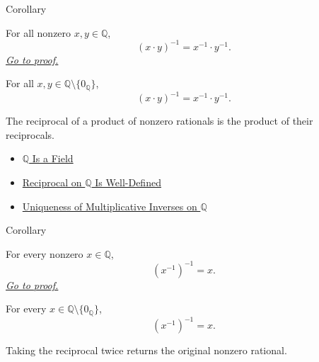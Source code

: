 \begin{corollarybox}{Corollary}
\begin{corollary}
\label{cor:inverse-of-product-on-q}
For all nonzero $x,y\in\mathbb{Q}$,
\[
(x\cdot y)^{-1}=x^{-1}\cdot y^{-1}.
\]
\hyperref[prf:inverse-of-product-on-q]{\textit{Go to proof.}}
\end{corollary}
\end{corollarybox}

\begin{remark*}
For all $x,y\in\mathbb{Q}\setminus\{0_{\mathbb{Q}}\}$,
\[
(x\cdot y)^{-1}=x^{-1}\cdot y^{-1}.
\]
\end{remark*}

\begin{remark*}[Interpretation]
The reciprocal of a product of nonzero rationals is the product of their
reciprocals.
\end{remark*}

\begin{dependencies}
\begin{itemize}
  \item \hyperref[thm:q-is-a-field]{$\mathbb{Q}$ Is a Field}
  \item \hyperref[thm:reciprocal-on-q-well-defined]{Reciprocal on $\mathbb{Q}$ Is Well-Defined}
  \item \hyperref[cor:uniqueness-multiplicative-inverse-on-q]{Uniqueness of Multiplicative Inverses on $\mathbb{Q}$}
\end{itemize}
\end{dependencies}

\begin{corollarybox}{Corollary}
\begin{corollary}
\label{cor:inverse-of-inverse-on-q}
For every nonzero $x\in\mathbb{Q}$,
\[
(x^{-1})^{-1}=x.
\]
\hyperref[prf:inverse-of-inverse-on-q]{\textit{Go to proof.}}
\end{corollary}
\end{corollarybox}

\begin{remark*}
For every $x\in\mathbb{Q}\setminus\{0_{\mathbb{Q}}\}$,
\[
(x^{-1})^{-1}=x.
\]
\end{remark*}

\begin{remark*}[Interpretation]
Taking the reciprocal twice returns the original nonzero rational.
\end{remark*}

